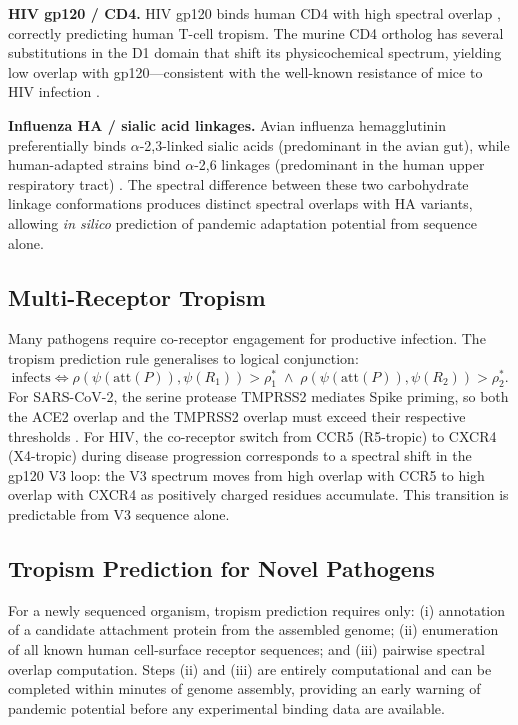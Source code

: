 \documentclass[twocolumn,11pt,a4paper]{article}
\theoremstyle{definition}
\theoremstyle{remark}
\begin{document}
\medskip\noindent\textbf{HIV gp120 / CD4.} HIV gp120 binds human CD4 with high
spectral overlap \citep{kwong1998}, correctly predicting human T-cell tropism.
The murine CD4 ortholog has several substitutions in the D1 domain that shift
its physicochemical spectrum, yielding low overlap with gp120---consistent with
the well-known resistance of mice to HIV infection \citep{berger1999}.

\medskip\noindent\textbf{Influenza HA / sialic acid linkages.} Avian influenza
hemagglutinin preferentially binds $\alpha$-2,3-linked sialic acids
(predominant in the avian gut), while human-adapted strains bind $\alpha$-2,6
linkages (predominant in the human upper respiratory tract) \citep{skehel2000}.
The spectral difference between these two carbohydrate linkage conformations
produces distinct spectral overlaps with HA variants, allowing \textit{in
silico} prediction of pandemic adaptation potential from sequence alone.

\subsection{Multi-Receptor Tropism}

Many pathogens require co-receptor engagement for productive infection. The
tropism prediction rule generalises to logical conjunction:
\begin{equation}
  \text{infects} \iff
    \rho(\psi(\text{att}(P)), \psi(R_1)) > \rho^*_1 \;\wedge\;
    \rho(\psi(\text{att}(P)), \psi(R_2)) > \rho^*_2.
  \label{eq:multi_receptor}
\end{equation}
For SARS-CoV-2, the serine protease TMPRSS2 mediates Spike priming, so both the
ACE2 overlap and the TMPRSS2 overlap must exceed their respective thresholds
\citep{hoffmann2020}. For HIV, the co-receptor switch from CCR5 (R5-tropic) to
CXCR4 (X4-tropic) during disease progression \citep{berger1999} corresponds to
a spectral shift in the gp120 V3 loop: the V3 spectrum moves from high overlap
with CCR5 to high overlap with CXCR4 as positively charged residues accumulate.
This transition is predictable from V3 sequence alone.

\subsection{Tropism Prediction for Novel Pathogens}

For a newly sequenced organism, tropism prediction requires only: (i) annotation
of a candidate attachment protein from the assembled genome; (ii) enumeration
of all known human cell-surface receptor sequences; and (iii) pairwise spectral
overlap computation. Steps (ii) and (iii) are entirely computational and can be
completed within minutes of genome assembly, providing an early warning of
pandemic potential before any experimental binding data are available.
\end{document}
